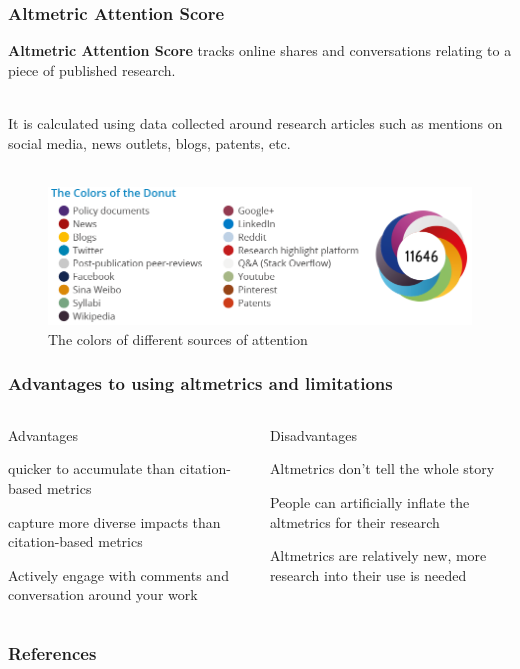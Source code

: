 \documentclass{beamer}
\begin{document}
\begin{frame}
    \frametitle{Altmetric Attention Score}

    \textbf{Altmetric Attention Score} tracks online shares and conversations relating to a piece of published research. \\~\

     It is calculated using data collected around research articles such as mentions on social media, news outlets, blogs, patents, etc.\\~\

    \begin{figure}[h]
        \includegraphics[height=0.41\textheight]{2.png}
        \caption{The colors of different sources of attention}
    \end{figure}
\end{frame}
\begin{frame}
    \frametitle{Advantages to using altmetrics and limitations}
    \begin{columns}[T]
        \begin{column}{.5\textwidth} \pause
            \centering Advantages 
            \begin{propslist}
                \item quicker to accumulate than citation-based metrics  \pause
                \item capture more diverse impacts than citation-based metrics \pause              
                \item Actively engage with comments and conversation around your work \pause
            \end{propslist}
        \end{column}
        \begin{column}{.5\textwidth}
            \centering Disadvantages %
            \begin{conslist}
                \item Altmetrics don’t tell the whole story \pause
                \item People can artificially inflate the altmetrics for their research \pause
                \item Altmetrics are relatively new, more research into their use is needed  \pause
            \end{conslist}
        \end{column}
    \end{columns}
\end{frame}


\begin{frame}[allowframebreaks]
    \frametitle{References}

    
    

\end{frame}
\end{document}
